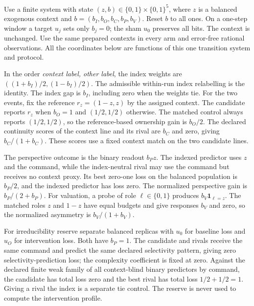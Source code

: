 \documentclass[11pt,a4paper]{article}
\theoremstyle{definition}
\begin{document}
Use a finite system with state $(z,b)\in\{0,1\}\times\{0,1\}^5$, where $z$ is a balanced exogenous context and $b=(b_I,b_O,b_C,b_P,b_V)$. Reset $b$ to all ones. On a one-step window a target $u_j$ sets only $b_j=0$; the sham $u_0$ preserves all bits. The context is unchanged. Use the same prepared contexts in every arm and error-free rational observations. All the coordinates below are functions of this one transition system and protocol.

In the order \emph{context label, other label}, the index weights are $((1+b_I)/2,(1-b_I)/2)$. The admissible within-run index relabelling is the identity. The index gap is $b_I$, including zero when the weights tie. For the two events, fix the reference $r_z=(1-z,z)$ by the assigned context. The candidate reports $r_z$ when $b_O=1$ and $(1/2,1/2)$ otherwise. The matched control always reports $(1/2,1/2)$, so the reference-based ownership gain is $b_O/2$. The declared continuity scores of the context line and its rival are $b_C$ and zero, giving $b_C/(1+b_C)$. These scores use a fixed context match on the two candidate lines.

The perspective outcome is the binary readout $b_Pz$. The indexed predictor uses $z$ and the command, while the index-neutral rival may use the command but receives no context proxy. Its best zero-one loss on the balanced population is $b_P/2$, and the indexed predictor has loss zero. The normalized perspective gain is $b_P/(2+b_P)$. For valuation, a probe of role $\ell\in\{0,1\}$ produces $b_V\mathbf1_{\ell=z}$. The matched roles $z$ and $1-z$ have equal budgets and give responses $b_V$ and zero, so the normalized asymmetry is $b_V/(1+b_V)$.

For irreducibility reserve separate balanced replicas with $u_0$ for baseline loss and $u_O$ for intervention loss. Both have $b_P=1$. The candidate and rivals receive the same command and predict the same declared selectivity pattern, giving zero selectivity-prediction loss; the complexity coefficient is fixed at zero. Against the declared finite weak family of all context-blind binary predictors by command, the candidate has total loss zero and the best rival has total loss $1/2+1/2=1$. Giving a rival the index is a separate tie control. The reserve is never used to compute the intervention profile.
\end{document}
